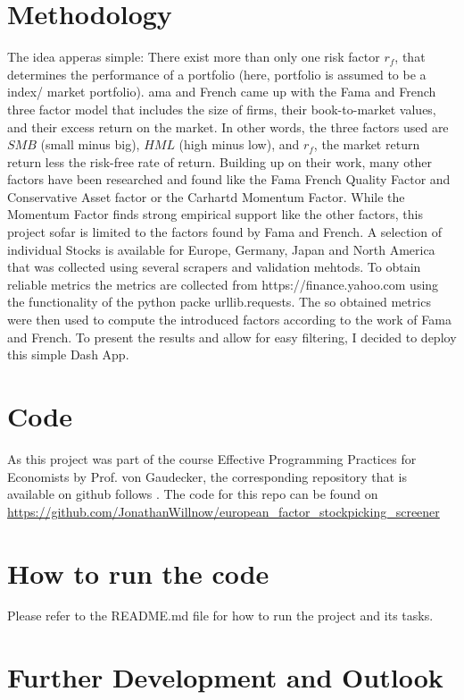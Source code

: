 \documentclass[11pt, a4paper, leqno]{article}
\begin{document}
\section{Methodology}
The idea apperas simple: There exist more than only one risk factor $r_f$,  that determines the
performance of a portfolio (here, portfolio is assumed to be a index/ market portfolio).
ama and French came up with the Fama and French three factor model that includes
the size of firms, their book-to-market values, and their excess return on the market. In other words, 
the three factors used are $SMB$ (small minus big), $HML$ (high minus low), and $r_f$, the
market return return less the risk-free rate of return. Building up on their work, many other
factors have been researched and found like the Fama French Quality Factor and Conservative 
Asset factor or the Carhartd Momentum Factor. While the Momentum Factor finds strong 
empirical support like the other factors, this project sofar is limited to the factors 
found by Fama and French. 
A selection of individual Stocks is available for Europe, Germany, Japan and North America
that was collected using several scrapers and validation mehtods. To obtain reliable metrics
the metrics are collected from https://finance.yahoo.com
using the functionality of the python packe urllib.requests. The so obtained metrics were then 
used to compute the introduced factors according to the work of Fama and French. To present the 
results and allow for easy filtering, I decided to deploy this simple Dash App.


\section{Code}
As this project was part of the course Effective Programming Practices for Economists by Prof. von Gaudecker, the corresponding repository 
that is available on github follows \citet{GaudeckerEconProjectTemplates}. The code for this repo can be found on \url{https://github.com/JonathanWillnow/european_factor_stockpicking_screener}

\section{How to run the code}
Please refer to the README.md file for how to run the project and its tasks.

\section{Further Development and Outlook}





\printbibliography
{}





\end{document}

